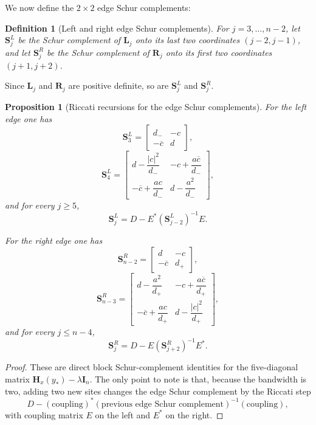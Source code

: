 \documentclass[11pt]{article}
\newtheorem{proposition}[theorem]{Proposition}
\newtheorem{definition}[theorem]{Definition}
\begin{document}
We now define the \(2\times2\) edge Schur complements:

\begin{definition}[Left and right edge Schur complements]\label{def:edge-schur}
For \(j=3,\dots,n-2\), let \(\mathbf S_j^L\) be the Schur complement of \(\mathbf L_j\) onto its last
two coordinates \((j-2,j-1)\), and let \(\mathbf S_j^R\) be the Schur complement of \(\mathbf R_j\) onto
its first two coordinates \((j+1,j+2)\).
\end{definition}

Since \(\mathbf L_j\) and \(\mathbf R_j\) are positive definite, so are \(\mathbf S_j^L\) and \(\mathbf S_j^R\).

\begin{proposition}[Riccati recursions for the edge Schur complements]\label{prop:edge-schur-recursion}
For the left edge one has
\[
\mathbf S_3^L=
\begin{bmatrix}
d_- & -c\\
-\overline c & d
\end{bmatrix},
\]
\[
\mathbf S_4^L=
\begin{bmatrix}
d-\dfrac{|c|^2}{d_-} & -c+\dfrac{a\overline c}{d_-}\\[3mm]
-\overline c+\dfrac{ac}{d_-} & d-\dfrac{a^2}{d_-}
\end{bmatrix},
\]
and for every \(j\ge 5\),
\[
\boxed{
\mathbf S_j^L = D - E^*(\mathbf S_{j-2}^L)^{-1}E.
}
\]

For the right edge one has
\[
\mathbf S_{n-2}^R=
\begin{bmatrix}
d & -c\\
-\overline c & d_+
\end{bmatrix},
\]
\[
\mathbf S_{n-3}^R=
\begin{bmatrix}
d-\dfrac{a^2}{d_+} & -c+\dfrac{a\overline c}{d_+}\\[3mm]
-\overline c+\dfrac{ac}{d_+} & d-\dfrac{|c|^2}{d_+}
\end{bmatrix},
\]
and for every \(j\le n-4\),
\[
\boxed{
\mathbf S_j^R = D - E(\mathbf S_{j+2}^R)^{-1}E^*.
}
\]
\end{proposition}

\begin{proof}
These are direct block Schur-complement identities for the five-diagonal matrix
\(\mathbf H_x(y_*)-\lambda \mathbf I_n\). The only point to note is that, because the bandwidth is two,
adding two new sites changes the edge Schur complement by the Riccati step
\[
D - (\text{coupling})^*(\text{previous edge Schur complement})^{-1}(\text{coupling}),
\]
with coupling matrix \(E\) on the left and \(E^*\) on the right.
\end{proof}
\end{document}
